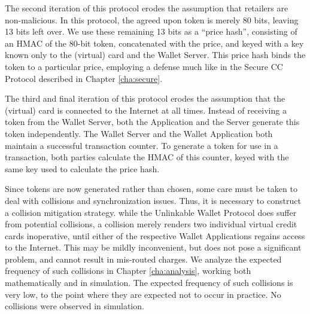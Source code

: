The second iteration of this protocol erodes the assumption that retailers are non-malicious.
In this protocol, the agreed upon token is merely 80 bits, leaving 13 bits left over.
We use these remaining 13 bits as a ``price hash'',
    consisting of an HMAC of the 80-bit token, concatenated with the price, and keyed with a key known only to the (virtual) card and the Wallet Server.
This price hash binds the token to a particular price, employing a defense much like in the Secure CC Protocol described in Chapter \ref{cha:secure}.

The third and final iteration of this protocol erodes the assumption that the (virtual) card is connected to the Internet at all times.
Instead of receiving a token from the Wallet Server, both the Application and the Server generate this token independently.
The Wallet Server and the Wallet Application both maintain a successful transaction counter.
To generate a token for use in a transaction, both parties calculate the HMAC of this counter, keyed with the same key used to calculate the price hash.


Since tokens are now generated rather than chosen, some care must be taken to deal with collisions and synchronization issues.
Thus, it is necessary to construct a collision mitigation strategy.
while the Unlinkable Wallet Protocol does suffer from potential collisions,
    a collision merely renders two individual virtual credit cards inoperative, until either of the respective Wallet Applications regains access to the Internet.
This may be mildly inconvenient, but does not pose a significant problem, and cannot result in mis-routed charges.
We analyze the expected frequency of such collisions in Chapter \ref{cha:analysis}, working both mathematically and in simulation.
The expected frequency of such collisions is very low, to the point where they are expected not to occur in practice.
No collisions were observed in simulation.
